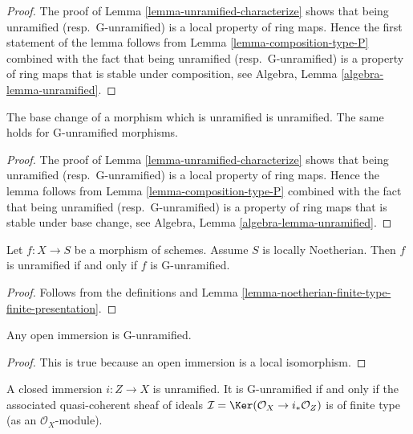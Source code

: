 \begin{proof}
The proof of Lemma \ref{lemma-unramified-characterize}
shows that being unramified (resp.\ G-unramified)
is a local property of ring maps.
Hence the first statement of the lemma follows from
Lemma \ref{lemma-composition-type-P} combined
with the fact that being unramified (resp.\ G-unramified)
is a property of ring maps that is stable under composition, see
Algebra, Lemma \ref{algebra-lemma-unramified}.
\end{proof}

\begin{lemma}
\label{lemma-base-change-unramified}
The base change of a morphism which is unramified is unramified.
The same holds for G-unramified morphisms.
\end{lemma}

\begin{proof}
The proof of Lemma \ref{lemma-unramified-characterize}
shows that being unramified (resp.\ G-unramified)
is a local property of ring maps. Hence the lemma follows from
Lemma \ref{lemma-composition-type-P} combined
with the fact that being unramified (resp.\ G-unramified)
is a property of ring maps that is stable under base change, see
Algebra, Lemma \ref{algebra-lemma-unramified}.
\end{proof}

\begin{lemma}
\label{lemma-noetherian-unramified}
Let $f : X \to S$ be a morphism of schemes. Assume $S$ is locally Noetherian.
Then $f$ is unramified if and only if $f$ is G-unramified.
\end{lemma}

\begin{proof}
Follows from the definitions and
Lemma \ref{lemma-noetherian-finite-type-finite-presentation}.
\end{proof}


\begin{lemma}
\label{lemma-open-immersion-unramified}
Any open immersion is G-unramified.
\end{lemma}

\begin{proof}
This is true because an open immersion is a local isomorphism.
\end{proof}

\begin{lemma}
\label{lemma-closed-immersion-unramified}
A closed immersion $i : Z \to X$ is unramified.
It is G-unramified if and only if the associated quasi-coherent sheaf of
ideals $\mathcal{I} = \Ker(\mathcal{O}_X \to i_*\mathcal{O}_Z)$
is of finite type (as an $\mathcal{O}_X$-module).
\end{lemma}

